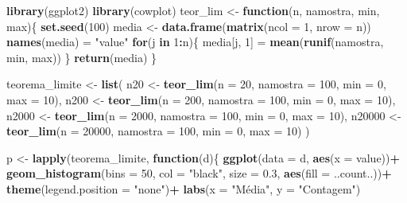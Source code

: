 \documentclass[
]{book}
\newenvironment{Shaded}{\begin{snugshade}}{\end{snugshade}}
\newcommand{\ControlFlowTok}[1]{\textcolor[rgb]{0.13,0.29,0.53}{\textbf{#1}}}
\newcommand{\DataTypeTok}[1]{\textcolor[rgb]{0.13,0.29,0.53}{#1}}
\newcommand{\DecValTok}[1]{\textcolor[rgb]{0.00,0.00,0.81}{#1}}
\newcommand{\FloatTok}[1]{\textcolor[rgb]{0.00,0.00,0.81}{#1}}
\newcommand{\KeywordTok}[1]{\textcolor[rgb]{0.13,0.29,0.53}{\textbf{#1}}}
\newcommand{\NormalTok}[1]{#1}
\newcommand{\OperatorTok}[1]{\textcolor[rgb]{0.81,0.36,0.00}{\textbf{#1}}}
\newcommand{\StringTok}[1]{\textcolor[rgb]{0.31,0.60,0.02}{#1}}
\begin{document}
\begin{Shaded}
\begin{Highlighting}[]
\KeywordTok{library}\NormalTok{(ggplot2)}
\KeywordTok{library}\NormalTok{(cowplot)}
\NormalTok{teor_lim <-}\StringTok{ }\ControlFlowTok{function}\NormalTok{(n, namostra, min, max)\{}
  \KeywordTok{set.seed}\NormalTok{(}\DecValTok{100}\NormalTok{)}
\NormalTok{  media <-}\StringTok{ }\KeywordTok{data.frame}\NormalTok{(}\KeywordTok{matrix}\NormalTok{(}\DataTypeTok{ncol =} \DecValTok{1}\NormalTok{, }\DataTypeTok{nrow =}\NormalTok{ n))}
  \KeywordTok{names}\NormalTok{(media) =}\StringTok{ "value"}
  \ControlFlowTok{for}\NormalTok{(j }\ControlFlowTok{in} \DecValTok{1}\OperatorTok{:}\NormalTok{n)\{}
\NormalTok{    media[j, }\DecValTok{1}\NormalTok{] =}\StringTok{ }\KeywordTok{mean}\NormalTok{(}\KeywordTok{runif}\NormalTok{(namostra, min, max))}
\NormalTok{  \}}
  \KeywordTok{return}\NormalTok{(media)}
\NormalTok{\}}

\NormalTok{teorema_limite <-}\StringTok{ }\KeywordTok{list}\NormalTok{(}
\NormalTok{  n20 <-}\StringTok{ }\KeywordTok{teor_lim}\NormalTok{(}\DataTypeTok{n =} \DecValTok{20}\NormalTok{, }\DataTypeTok{namostra =} \DecValTok{100}\NormalTok{, }\DataTypeTok{min =} \DecValTok{0}\NormalTok{, }\DataTypeTok{max =} \DecValTok{10}\NormalTok{),}
\NormalTok{  n200 <-}\StringTok{ }\KeywordTok{teor_lim}\NormalTok{(}\DataTypeTok{n =} \DecValTok{200}\NormalTok{, }\DataTypeTok{namostra =} \DecValTok{100}\NormalTok{, }\DataTypeTok{min =} \DecValTok{0}\NormalTok{, }\DataTypeTok{max =} \DecValTok{10}\NormalTok{),}
\NormalTok{  n2000 <-}\StringTok{ }\KeywordTok{teor_lim}\NormalTok{(}\DataTypeTok{n =} \DecValTok{2000}\NormalTok{, }\DataTypeTok{namostra =} \DecValTok{100}\NormalTok{, }\DataTypeTok{min =} \DecValTok{0}\NormalTok{, }\DataTypeTok{max =} \DecValTok{10}\NormalTok{),}
\NormalTok{  n20000 <-}\StringTok{ }\KeywordTok{teor_lim}\NormalTok{(}\DataTypeTok{n =} \DecValTok{20000}\NormalTok{, }\DataTypeTok{namostra =} \DecValTok{100}\NormalTok{, }\DataTypeTok{min =} \DecValTok{0}\NormalTok{, }\DataTypeTok{max =} \DecValTok{10}\NormalTok{)}
\NormalTok{)}

\NormalTok{p <-}\StringTok{ }\KeywordTok{lapply}\NormalTok{(teorema_limite, }\ControlFlowTok{function}\NormalTok{(d)\{}
  \KeywordTok{ggplot}\NormalTok{(}\DataTypeTok{data =}\NormalTok{ d, }\KeywordTok{aes}\NormalTok{(}\DataTypeTok{x =}\NormalTok{ value))}\OperatorTok{+}
\StringTok{    }\KeywordTok{geom_histogram}\NormalTok{(}\DataTypeTok{bins =} \DecValTok{50}\NormalTok{,}
                   \DataTypeTok{col =} \StringTok{"black"}\NormalTok{,}
                   \DataTypeTok{size =} \FloatTok{0.3}\NormalTok{,}
                   \KeywordTok{aes}\NormalTok{(}\DataTypeTok{fill =}\NormalTok{ ..count..))}\OperatorTok{+}
\StringTok{    }\KeywordTok{theme}\NormalTok{(}\DataTypeTok{legend.position =} \StringTok{"none"}\NormalTok{)}\OperatorTok{+}
\StringTok{    }\KeywordTok{labs}\NormalTok{(}\DataTypeTok{x =} \StringTok{"Média"}\NormalTok{, }\DataTypeTok{y =} \StringTok{"Contagem"}\NormalTok{)}
  

\end{Highlighting}
\end{Shaded}
\end{document}
